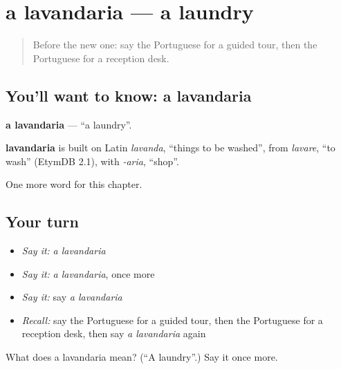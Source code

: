 \section[a lavandaria]{a lavandaria — a laundry}

\label{lesson:PT-C197-lavandaria}



\begin{quote}
Before the new one: say the Portuguese for a guided tour, then the Portuguese for a reception desk.
\end{quote}

\subsection*{You'll want to know: a lavandaria}
\textbf{a lavandaria} — \textquotedblleft{}a laundry\textquotedblright{}.

\begin{cousinweb}
\textbf{lavandaria} is built on Latin \emph{lavanda}, \textquotedblleft{}things to be washed\textquotedblright{}, from \emph{lavare}, \textquotedblleft{}to wash\textquotedblright{} (EtymDB 2.1), with \emph{-aria}, \textquotedblleft{}shop\textquotedblright{}.
\end{cousinweb}

\begin{grammarlens}[title={What you've built}]
One more word for this chapter.
\end{grammarlens}

\subsection*{Your turn}
\begin{itemize}
\raggedright
  \item \emph{Say it:} \emph{a lavandaria}
  \item \emph{Say it:} \emph{a lavandaria}, once more
  \item \emph{Say it:} say \emph{a lavandaria}
  \item \emph{Recall:} say the Portuguese for a guided tour, then the Portuguese for a reception desk, then say \emph{a lavandaria} again
\end{itemize}

\begin{tcolorbox}[breakable,colback=teal!4,colframe=teal!35!black,title={Before you move on}]
What does a lavandaria mean? (\textquotedblleft{}A laundry\textquotedblright{}.) Say it once more.
\end{tcolorbox}
